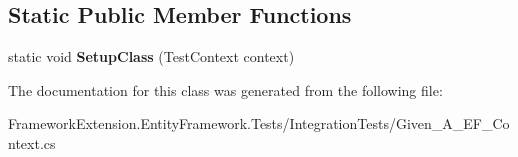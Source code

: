\subsection*{Static Public Member Functions}
\begin{DoxyCompactItemize}
\item 
\hypertarget{class_framework_extension_1_1_entity_framework_1_1_tests_1_1_integration_tests_1_1_given___a___e_f___context_a633632ed97bf8f7aa2577a419df6bed2}{static void {\bfseries Setup\-Class} (Test\-Context context)}\label{class_framework_extension_1_1_entity_framework_1_1_tests_1_1_integration_tests_1_1_given___a___e_f___context_a633632ed97bf8f7aa2577a419df6bed2}

\end{DoxyCompactItemize}


The documentation for this class was generated from the following file\-:\begin{DoxyCompactItemize}
\item 
Framework\-Extension.\-Entity\-Framework.\-Tests/\-Integration\-Tests/Given\-\_\-\-A\-\_\-\-E\-F\-\_\-\-Context.\-cs\end{DoxyCompactItemize}
